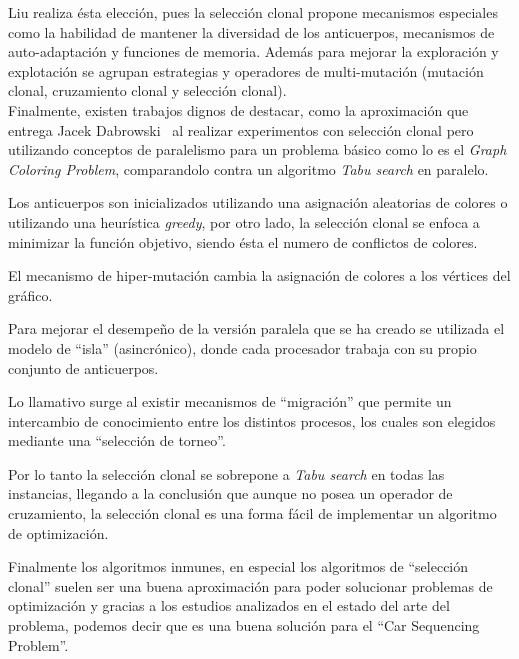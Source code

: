 Liu realiza ésta elección, pues la selección clonal propone mecanismos especiales como la habilidad de mantener la diversidad
de los anticuerpos, mecanismos de auto-adaptación y funciones de memoria. Además para mejorar la exploración y explotación
se agrupan estrategias y operadores de multi-mutación (mutación clonal, cruzamiento clonal y selección clonal).\\


Finalmente, existen trabajos dignos de destacar, como la aproximación que entrega Jacek Dabrowski~\cite{graph}
al realizar experimentos con selección clonal pero utilizando conceptos de paralelismo para un problema básico como lo es
el \emph{Graph Coloring Problem}, comparandolo contra un algoritmo \emph{Tabu search} en paralelo.

Los anticuerpos son inicializados utilizando una asignación aleatorias de colores o utilizando una heurística \emph{greedy},
por otro lado, la selección clonal se enfoca a minimizar la función objetivo, siendo ésta el numero de conflictos de colores.

El mecanismo de hiper-mutación cambia la asignación de colores a los vértices del gráfico.

Para mejorar el desempeño de la versión paralela que se ha creado se utilizada el modelo de ``isla'' (asincrónico),
donde cada procesador trabaja con su propio conjunto de anticuerpos.

Lo llamativo surge al existir mecanismos de ``migración'' que permite un intercambio de conocimiento entre los 
distintos procesos, los cuales son elegidos mediante una ``selección de torneo''.

Por lo tanto la selección clonal se sobrepone a \emph{Tabu search} en todas las instancias,
llegando a la conclusión que aunque no posea un operador de cruzamiento, la selección clonal
es una forma fácil de implementar un algoritmo de optimización.


Finalmente los algoritmos inmunes, en especial los algoritmos de ``selección clonal'' suelen ser una buena aproximación
para poder solucionar problemas de optimización y gracias a los estudios analizados en el estado del arte del problema,
podemos decir que es una buena solución para el ``Car Sequencing Problem''.
